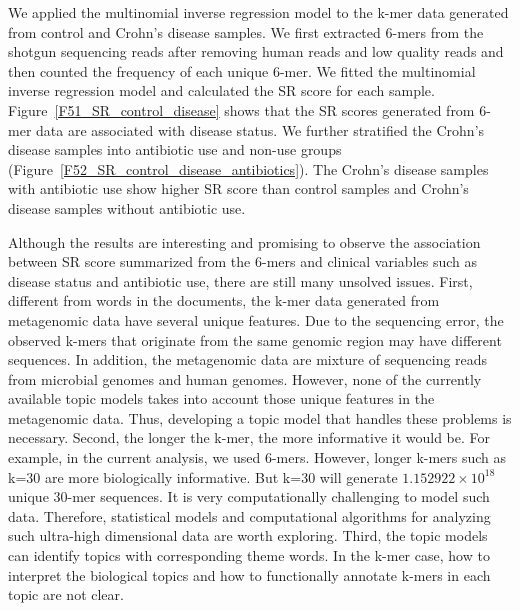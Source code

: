 We applied the multinomial inverse regression model to the k-mer data generated from control and Crohn's disease samples. We first extracted 6-mers from the shotgun sequencing reads after removing human reads and low quality reads and then counted the frequency of each unique 6-mer. We fitted the multinomial inverse regression model and calculated the SR score for each sample. Figure~\ref{F51_SR_control_disease} shows that the SR scores generated from 6-mer data are associated with disease status. We further stratified  the Crohn's disease samples into antibiotic use and non-use groups (Figure~\ref{F52_SR_control_disease_antibiotics}). The Crohn's disease samples with antibiotic use show higher SR score than control samples and Crohn's disease samples without antibiotic use.

Although the results are interesting  and promising to observe  the association between SR score summarized from the 6-mers and clinical variables such as disease status and antibiotic use, there are still many unsolved  issues. First, different from words in the documents, the k-mer data generated from metagenomic data have several unique features.  Due to the sequencing error, the observed k-mers that originate from the same genomic region may have different sequences. In addition, the metagenomic data are mixture of sequencing reads from microbial genomes and human genomes. However, none of the currently available topic models takes into account those unique features in the metagenomic data. Thus, developing a topic model that handles these problems is necessary. Second, the longer the k-mer, the more informative it would be. For example, in the current analysis, we used 6-mers. However, longer k-mers such as k=30 are more biologically informative. But k=30 will generate $1.152922\times 10^{18} $ unique 30-mer sequences. It is very computationally challenging to model such data. Therefore, statistical models and computational algorithms for analyzing such ultra-high dimensional data are worth exploring. Third, the topic models can identify  topics with corresponding  theme words. In the k-mer case, how to interpret the biological topics and how to functionally  annotate k-mers in each topic are not clear. 

 

